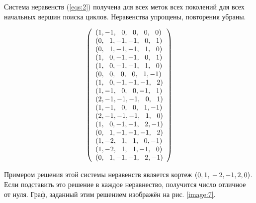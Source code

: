 \documentclass[14pt]{mmcs-article}
\begin{document}
Система неравенств (\ref{eqs:2}) получена для всех меток всех поколений для всех начальных вершин поиска циклов. Неравенства упрощены, повторения убраны.

\begin{equation}
  \centering
    \left(
      \begin{array}{ll}
        (1,-1,\ \ 0,\ \ 0,\ \ 0,\ \ 0)\\
        (0,\ \ 1,-1,-1,\ \ 0,\ \ 1)\\
        (0,\ \ 1,-1,-1,\ \ 1,\ \ 0)\\
        (1,\ \ 0,-1,-1,\ \ 0,\ \ 1)\\
        (1,\ \ 0,-1,-1,\ \ 1,\ \ 0)\\
        (0,\ \ 0,\ \ 0,\ \ 0,\ \ 1,-1)\\
        (1,\ \ 0,-1,-1,-1,\ \ 2)\\
        (1,-1,\ \ 0,\ \ 0,-1,\ \ 1)\\
        (2,-1,-1,-1,\ \ 0,\ \ 1)\\
        (1,-1,\ \ 0,\ \ 0,\ \ 1,-1)\\
        (2,-1,-1,-1,\ \ 1,\ \ 0)\\
        (1,\ \ 0,-1,-1,\ \ 2,-1)\\
        (0,\ \ 1,-1,-1,-1,\ \ 2)\\
        (1,-2,\ \ 1,\ \ 1,\ \ 0,-1)\\
        (1,-2,\ \ 1,\ \ 1,-1,\ \ 0)\\
        (0,\ \ 1,-1,-1,\ \ 2,-1)\\
      \end{array}
    \right)
  \label{eqs:2}
\end{equation}

Примером решения этой системы неравенств является кортеж $(0, 1,\\ -2, -1, 2, 0)$. Если подставить это решение в каждое неравнество, получится число отличное от нуля. Граф, заданный этим решением изображён на рис. \ref{image:7}.
\end{document}
